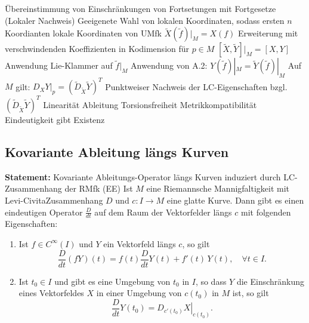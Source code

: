\documentclass[10pt, letterpaper]{article}
\begin{document}
{%
\begin{outline}
  \1 Übereinstimmung von Einschränkungen von Fortsetungen mit Fortgesetze (Lokaler Nachweis)
  \2 Geeigenete Wahl von lokalen Koordinaten, sodass ersten $n$ Koordianten lokale Koordinaten von UMfk
  \2 $\tilde X(\tilde f)|_M= X(f)$ 
  \3 Erweiterung mit verschwindenden Koeffizienten in Kodimension für $p\in M$
  \2 $[\tilde X,\tilde Y]|_M= [X,Y]$
  \3 Anwendung Lie-Klammer auf $\tilde f|_M$
  \3 Anwendung von A.2: $Y(\tilde f)|_M=\tilde Y(\tilde f)|_M$
  \1 Auf $M$ gilt: $\left.D_{X} Y\right|_{p}=\left(\tilde{D}_{\tilde{X}} \tilde{Y}\right)^{T}$
  \2 Punktweiser Nachweis der LC-Eigenschaften bzgl. $\left(\tilde{D}_{\tilde{X}} \tilde{Y}\right)^{T}$
  \3 Linearität
  \3 Ableitung
  \3 Torsionsfreiheit
  \3 Metrikkompatibilität
  \2 Eindeutigkeit gibt Existenz
\end{outline}
}

\vspace{0.7cm}






\pagebreak

\subsection{Kovariante Ableitung längs Kurven}


\textbf{Statement: }{Kovariante Ableitungs-Operator längs Kurven induziert durch LC-Zusammenhang der RMfk (EE)}
Ist $M$ eine Riemannsche Mannigfaltigkeit mit Levi-CivitaZusammenhang $D$ und $c: I \rightarrow M$ eine glatte Kurve. Dann gibt es einen eindeutigen Operator $\frac{D}{d t}$ auf dem Raum der Vektorfelder längs $c$ mit folgenden Eigenschaften:
\begin{enumerate}
  \item Ist $f \in C^{\infty}(I)$ und $Y$ ein Vektorfeld längs $c$, so gilt
  \[
  \frac{D}{dt}(f Y)(t) = f(t) \frac{D}{dt} Y(t) + f'(t)\, Y(t), \quad \forall t \in I.
  \]
  
  \item Ist $t_0 \in I$ und gibt es eine Umgebung von $t_0$ in $I$, so dass $Y$ die Einschränkung eines Vektorfeldes $X$ in einer Umgebung von $c(t_0)$ in $M$ ist, so gilt
  \[
  \frac{D}{dt} Y(t_0) = \left. D_{c'(t_0)} X \right|_{c(t_0)}.
  \]
\end{enumerate}
\end{document}
